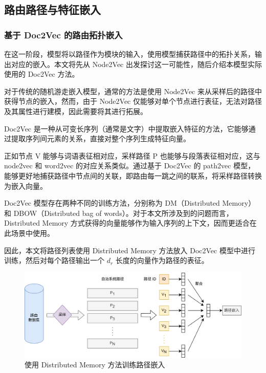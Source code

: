 \subsection{路由路径与特征嵌入}

\subsubsection{基于 Doc2Vec 的路由拓扑嵌入}

在这一阶段，模型将以路径作为模块的输入，使用模型捕获路径中的拓扑关系，输出对应的嵌入。本文将先从 Node2Vec 出发探讨这一可能性，随后介绍本模型实际使用的 Doc2Vec 方法。

对于传统的随机游走嵌入模型，通常的方法是使用 Node2Vec 来从采样后的路径中获得节点的嵌入，然而，由于 Node2Vec 仅能够对单个节点进行表征，无法对路径及其属性进行建模，因此需要将其进行拓展。

Doc2Vec 是一种从可变长序列（通常是文字）中提取嵌入特征的方法，它能够通过提取序列间元素的关系，直接对整个序列生成特征向量。

正如节点 V 能够与词语表征相对应，采样路径 P 也能够与段落表征相对应，这与 node2vec 和 word2vec 的对应关系类似。通过基于 Doc2Vec 的 path2vec 模型，能够更好地捕获路径中节点间的关联，即路由每一跳之间的联系，将采样路径转换为嵌入向量。

Doc2Vec 模型存在两种不同的训练方法，分别称为 DM（Distributed Memory）和 DBOW（Distributed bag of words）。对于本文所涉及到的问题而言，Distributed Memory 方式获得的向量能够作为输入序列的上下文，因而更适合在此场景中使用。

因此，本文将路径列表使用 Distributed Memory 方法放入 Doc2Vec 模型中进行训练，然后对每个路径输出一个 $d_r$ 长度的向量作为路径的表征。

\begin{figure}[h]
    \includegraphics[width=0.9\linewidth]{chapter/c5_images/c5_model-dm.png}
    \caption{使用 Distributed Memory 方法训练路径嵌入}
    \label{c5_model-dm}
\end{figure}

